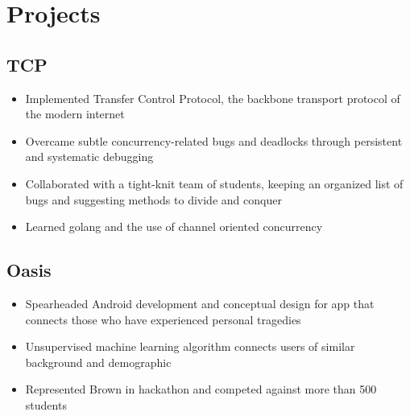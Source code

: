 \documentclass[11pt]{article}
\begin{document}

\section{Projects}

\subsection{TCP}
\begin{itemize}
	\item Implemented Transfer Control Protocol, the backbone transport protocol of the modern internet 
	\item Overcame subtle concurrency-related bugs and deadlocks through persistent and systematic debugging 
	\item Collaborated with a tight-knit team of students, keeping an organized list of bugs and suggesting methods to divide and conquer
	\item Learned golang and the use of channel oriented concurrency
\end{itemize}

\subsection{Oasis}
\begin{itemize}
	\item Spearheaded Android development and conceptual design for app that connects those who have
experienced personal tragedies
	\item Unsupervised machine learning algorithm connects users of similar background and demographic
	\item Represented Brown in hackathon and competed against more than 500 students
\end{itemize}
\end{document}
